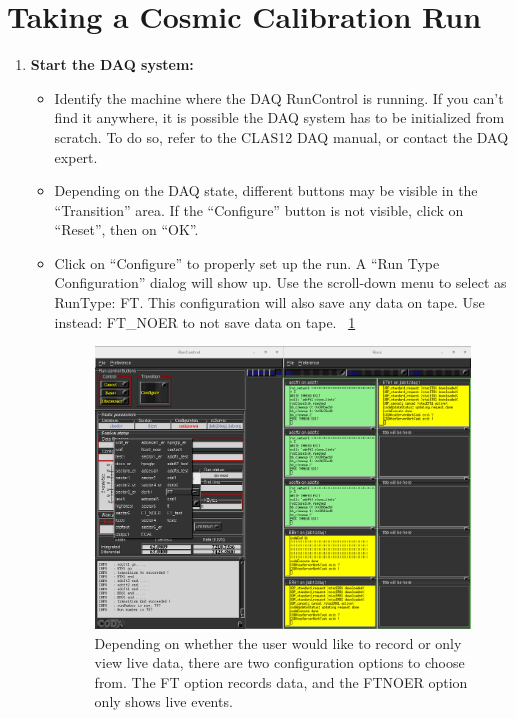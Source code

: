 \documentclass[11.5pt]{article}
\begin{document}
\section{Taking a Cosmic Calibration Run}
\begin{enumerate}
\item{\textbf{Start the DAQ system: }}
\begin{itemize}
\item Identify the machine where the DAQ RunControl is running. If you can't find it anywhere, it is possible the DAQ system has to be initialized from scratch. To do so, refer to the CLAS12 DAQ manual, or contact the DAQ expert.
\item Depending on the DAQ state, different buttons may be visible in the ``Transition'' area. If the ``Configure'' button is not visible, click on ``Reset'', then on ``OK''.
\item Click on ``Configure'' to properly set up the run. A ``Run Type Configuration'' dialog will show up. Use the scroll-down menu to select as RunType: FT. This configuration will also save any data on tape. Use instead: FT\_NOER to not save data on tape. ~\ref{fig:SELFTRIG1}

\begin{figure}[htbp]\centering
     \includegraphics[scale=0.33]{pics/SELF_TRIGGER_0.png}
     \caption{Depending on whether the user would like to record or only view live data, there are two configuration options to choose from. The FT option records data, and the FT\textunderscore NOER option only shows live events. \label{fig:SELFTRIG1}}
\end{figure} 


\end{itemize}
\end{enumerate}
\end{document}
